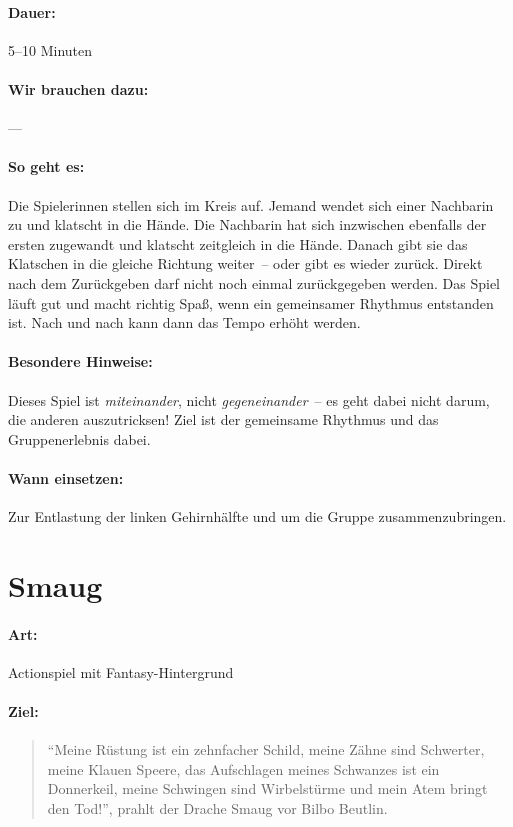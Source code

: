 \paragraph{Dauer:} 5--10 Minuten
\paragraph{Wir brauchen dazu:} ---
\paragraph{So geht es:} Die Spielerinnen stellen sich im Kreis auf. Jemand wendet sich einer Nachbarin zu und klatscht in die Hände. Die Nachbarin hat sich inzwischen ebenfalls der ersten zugewandt und klatscht zeitgleich in die Hände. Danach gibt sie das Klatschen in die gleiche Richtung weiter~-- oder gibt es wieder zurück. Direkt nach dem Zurückgeben darf nicht noch einmal zurückgegeben werden. Das Spiel läuft gut und macht richtig Spaß, wenn ein gemeinsamer Rhythmus entstanden ist. Nach und nach kann dann das Tempo erhöht werden.
\paragraph{Besondere Hinweise:} Dieses Spiel ist \emph{miteinander}, nicht \emph{gegeneinander}~-- es geht dabei nicht darum, die anderen auszutricksen! Ziel ist der gemeinsame Rhythmus und das Gruppenerlebnis dabei.
\paragraph{Wann einsetzen:} Zur Entlastung der linken Gehirnhälfte und um die Gruppe zusammenzubringen.

\section{Smaug}
\paragraph{Art:} Actionspiel mit Fantasy-Hintergrund
\paragraph{Ziel:}
\begin{quote}
  "`Meine Rüstung ist ein zehnfacher Schild, meine Zähne sind Schwerter, meine Klauen Speere, das Aufschlagen meines Schwanzes ist ein Donnerkeil, meine Schwingen sind Wirbelstürme und mein Atem bringt den Tod!"', prahlt der Drache Smaug vor Bilbo Beutlin.
\end{quote}

